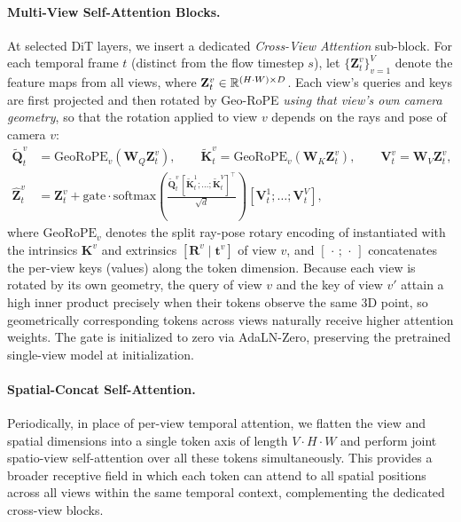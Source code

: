 \paragraph{Multi-View Self-Attention Blocks.}
At selected DiT layers, we insert a dedicated \emph{Cross-View Attention} sub-block. For each temporal frame $t$ (distinct from the flow timestep $s$), let $\{\mathbf{Z}_t^v\}_{v=1}^{V}$ denote the feature maps from all views, where $\mathbf{Z}_t^v \in \mathbb{R}^{(H \cdot W) \times D}$. Each view's queries and keys are first projected and then rotated by Geo-RoPE \emph{using that view's own camera geometry}, so that the rotation applied to view $v$ depends on the rays and pose of camera $v$:
\begin{equation}
\label{eq:cross-view-attn}
\begin{aligned}
\tilde{\mathbf{Q}}_t^v &= \mathrm{GeoRoPE}_v\!\left(\mathbf{W}_Q \mathbf{Z}_t^v\right), \qquad
\tilde{\mathbf{K}}_t^v = \mathrm{GeoRoPE}_v\!\left(\mathbf{W}_K \mathbf{Z}_t^v\right), \qquad
\mathbf{V}_t^v = \mathbf{W}_V \mathbf{Z}_t^v, \\
\hat{\mathbf{Z}}_t^v &= \mathbf{Z}_t^v + \text{gate} \cdot \mathrm{softmax}\!\left(\frac{\tilde{\mathbf{Q}}_t^v \, [\tilde{\mathbf{K}}_t^1; \ldots; \tilde{\mathbf{K}}_t^V]^\top}{\sqrt{d}}\right) [\mathbf{V}_t^1; \ldots; \mathbf{V}_t^V],
\end{aligned}
\end{equation}
where $\mathrm{GeoRoPE}_v$ denotes the split ray-pose rotary encoding of  instantiated with the intrinsics $\mathbf{K}^v$ and extrinsics $[\mathbf{R}^v \mid \mathbf{t}^v]$ of view $v$, and $[\,\cdot\,;\,\cdot\,]$ concatenates the per-view keys (values) along the token dimension. Because each view is rotated by its own geometry, the query of view $v$ and the key of view $v'$ attain a high inner product precisely when their tokens observe the same 3D point, so geometrically corresponding tokens across views naturally receive higher attention weights. The gate is initialized to zero via AdaLN-Zero, preserving the pretrained single-view model at initialization.

\paragraph{Spatial-Concat Self-Attention.}
Periodically, in place of per-view temporal attention, we flatten the view and spatial dimensions into a single token axis of length $V \cdot H \cdot W$ and perform joint spatio-view self-attention over all these tokens simultaneously. This provides a broader receptive field in which each token can attend to all spatial positions across all views within the same temporal context, complementing the dedicated cross-view blocks.

